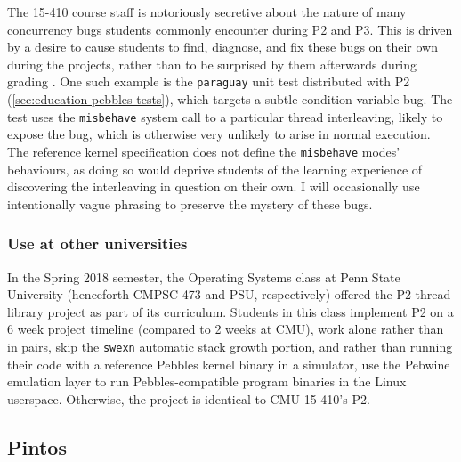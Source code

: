 The 15-410 course staff is notoriously secretive about the nature of many concurrency bugs
students commonly encounter during P2 and P3.
This is driven by a desire to cause students to find, diagnose, and fix these bugs on their own during the projects,
rather than to be surprised by them afterwards during grading
\cite{de0u-2018}.
%
One such example is the {\tt paraguay} unit test distributed with P2 (\cref{sec:education-pebbles-tests}),
which targets a subtle condition-variable bug.
The test uses the {\tt misbehave} system call to  a particular thread interleaving,
likely to expose the bug,
which is otherwise very unlikely to arise in normal execution.
The reference kernel specification \cite{kspec} does not define the {\tt misbehave} modes' behaviours,
as doing so would deprive students of the learning experience of discovering the interleaving in question on their own.
%
I will occasionally use intentionally vague phrasing to preserve the mystery of these bugs.

\subsubsection{Use at other universities}
\label{sec:overview-psu}

\newcommand\psuos{CMPSC 473\xspace}

In the Spring 2018 semester,
the Operating Systems class at Penn State University (henceforth \psuos and PSU, respectively)
offered the P2 thread library project as part of its curriculum.
Students in this class implement P2
on a 6 week project timeline (compared to 2 weeks at CMU),
work alone rather than in pairs,
skip the {\tt swexn} automatic stack growth portion,
and rather than running their code with a reference Pebbles kernel binary in a simulator,
use the Pebwine emulation layer \cite{pebwine}
to run Pebbles-compatible program binaries in the Linux userspace.
Otherwise, the project is identical to CMU 15-410's P2.

\subsection{Pintos}
\label{sec:overview-pintos}

\newcommand\uchos{CMSC 23000\xspace}

